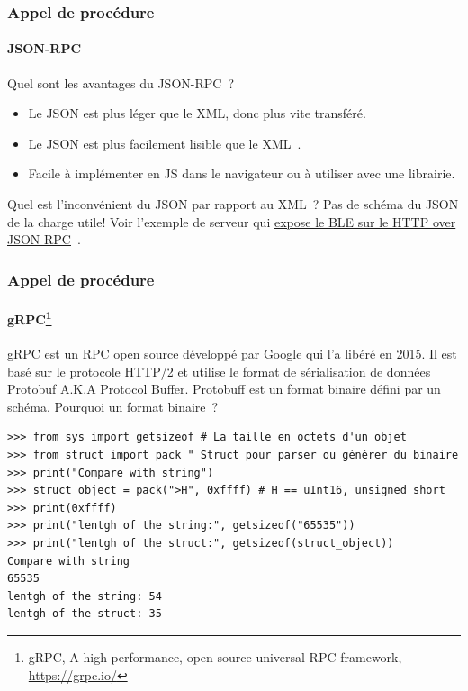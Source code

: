 \documentclass{beamer}
\begin{document}
    \begin{frame}
        \transdissolve
        \frametitle{Appel de procédure}
        \framesubtitle{JSON-RPC}
        Quel sont les avantages du JSON-RPC~?
        \pause
        \bigbreak
        \begin{itemize}
            \item Le JSON est plus léger que le XML, donc plus vite transféré.
            \item Le JSON est plus facilement lisible que le XML~.
            \item Facile à implémenter en JS dans le navigateur ou à utiliser avec une librairie.
        \end{itemize}
        \bigbreak
        Quel est l'inconvénient du JSON par rapport au XML~?
        \pause
        \bigbreak
        Pas de schéma du JSON de la charge utile!
        \bigbreak
        Voir l'exemple de serveur qui \href{https://github.com/St-Michel-IT/testing/blob/master/ble_to_rpc.py}{expose le BLE sur le HTTP over JSON-RPC}~.
    \end{frame}

    \begin{frame}[fragile]
        \transdissolve
        \frametitle{Appel de procédure}
        \framesubtitle{gRPC\footnote{gRPC, A high performance, open source universal RPC framework, \url{https://grpc.io/}}}
        gRPC est un RPC open source développé par Google qui l'a libéré en 2015.
        \bigbreak
        Il est basé sur le protocole HTTP/2 et utilise le format de sérialisation de données Protobuf A.K.A Protocol Buffer.
        Protobuff est un format binaire défini par un schéma.
        \bigbreak
        Pourquoi un format binaire~?
        \begin{lstlisting}
>>> from sys import getsizeof # La taille en octets d'un objet
>>> from struct import pack " Struct pour parser ou générer du binaire
>>> print("Compare with string")
>>> struct_object = pack(">H", 0xffff) # H == uInt16, unsigned short
>>> print(0xffff)
>>> print("lentgh of the string:", getsizeof("65535"))
>>> print("lentgh of the struct:", getsizeof(struct_object))
Compare with string
65535
lentgh of the string: 54
lentgh of the struct: 35
        \end{lstlisting}
    \end{frame}
\end{document}
